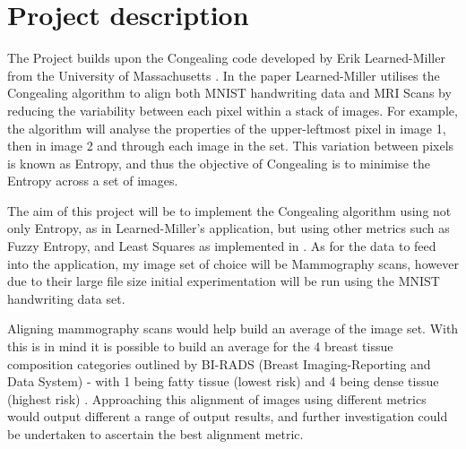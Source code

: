 \documentclass[11pt,fleqn,twoside]{article}
\begin{document}
\wordcount{}

\mmp

\setcounter{tocdepth}{3} %


\section{Project description}

The Project builds upon the Congealing code developed by Erik Learned-Miller from the University of Massachusetts \cite{joint-alignment}. In the paper Learned-Miller utilises the Congealing algorithm to align both MNIST handwriting data and MRI Scans by reducing the variability between each pixel within a stack of images. For example, the algorithm will analyse the properties of the upper-leftmost pixel in image 1, then in image 2 and through each image in the set. This variation between pixels is known as Entropy, and thus the objective of Congealing is to minimise the Entropy across a set of images.

The aim of this project will be to implement the Congealing algorithm using not only Entropy, as in Learned-Miller's application, but using other metrics such as Fuzzy Entropy, and Least Squares as implemented in \cite{least-squares-congealing}. As for the data to feed into the application, my image set of choice will be Mammography scans, however due to their large file size initial experimentation will be run using the MNIST handwriting data set.

Aligning mammography scans would help build an average of the image set. With this is in mind it is possible to build an average for the 4 breast tissue composition categories outlined by BI-RADS (Breast Imaging-Reporting and Data System) - with 1 being fatty tissue (lowest risk) and 4 being dense tissue (highest risk) \cite{bi-rads}. Approaching this alignment of images using different metrics would output different a range of output results, and further investigation could be undertaken to ascertain the best alignment metric.
\end{document}

